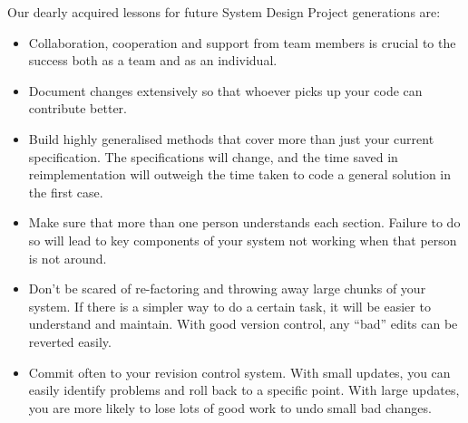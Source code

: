 \documentclass[journal,a4paper,12pt]{IEEEtran}
\begin{document}
Our dearly acquired lessons for future System Design Project generations are:
\begin{itemize}
\item Collaboration, cooperation and support from team members is crucial to the success both as a team and as an individual.
\item Document changes extensively so that whoever picks up your code can contribute better.
\item Build highly generalised methods that cover more than just your current specification. The specifications will change, and the time saved in reimplementation will outweigh the time taken to code a general solution in the first case.
\item Make sure that more than one person understands each section. Failure to do so will lead to key components of your system not working when that person is not around.
\item Don't be scared of re-factoring and throwing away large chunks of your system. If there is a simpler way to do a certain task, it will be easier to understand and maintain. With good version control, any ``bad'' edits can be reverted easily.
\item Commit often to your revision control system. With small updates, you can easily identify problems and roll back to a specific point. With large updates, you are more likely to lose lots of good work to undo small bad changes.
\end{itemize}
\end{document}
